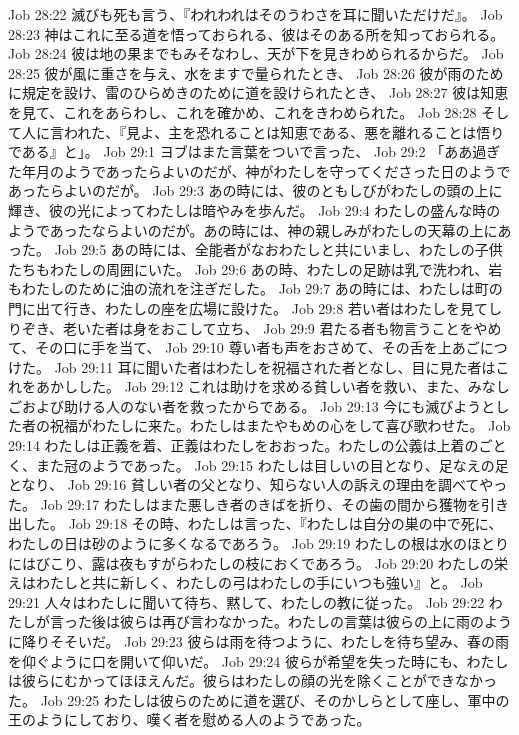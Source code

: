 Job 28:22  滅びも死も言う、『われわれはそのうわさを耳に聞いただけだ』。
Job 28:23  神はこれに至る道を悟っておられる、彼はそのある所を知っておられる。
Job 28:24  彼は地の果までもみそなわし、天が下を見きわめられるからだ。
Job 28:25  彼が風に重さを与え、水をますで量られたとき、
Job 28:26  彼が雨のために規定を設け、雷のひらめきのために道を設けられたとき、
Job 28:27  彼は知恵を見て、これをあらわし、これを確かめ、これをきわめられた。
Job 28:28  そして人に言われた、『見よ、主を恐れることは知恵である、悪を離れることは悟りである』と」。
Job 29:1  ヨブはまた言葉をついで言った、
Job 29:2  「ああ過ぎた年月のようであったらよいのだが、神がわたしを守ってくださった日のようであったらよいのだが。
Job 29:3  あの時には、彼のともしびがわたしの頭の上に輝き、彼の光によってわたしは暗やみを歩んだ。
Job 29:4  わたしの盛んな時のようであったならよいのだが。あの時には、神の親しみがわたしの天幕の上にあった。
Job 29:5  あの時には、全能者がなおわたしと共にいまし、わたしの子供たちもわたしの周囲にいた。
Job 29:6  あの時、わたしの足跡は乳で洗われ、岩もわたしのために油の流れを注ぎだした。
Job 29:7  あの時には、わたしは町の門に出て行き、わたしの座を広場に設けた。
Job 29:8  若い者はわたしを見てしりぞき、老いた者は身をおこして立ち、
Job 29:9  君たる者も物言うことをやめて、その口に手を当て、
Job 29:10  尊い者も声をおさめて、その舌を上あごにつけた。
Job 29:11  耳に聞いた者はわたしを祝福された者となし、目に見た者はこれをあかしした。
Job 29:12  これは助けを求める貧しい者を救い、また、みなしごおよび助ける人のない者を救ったからである。
Job 29:13  今にも滅びようとした者の祝福がわたしに来た。わたしはまたやもめの心をして喜び歌わせた。
Job 29:14  わたしは正義を着、正義はわたしをおおった。わたしの公義は上着のごとく、また冠のようであった。
Job 29:15  わたしは目しいの目となり、足なえの足となり、
Job 29:16  貧しい者の父となり、知らない人の訴えの理由を調べてやった。
Job 29:17  わたしはまた悪しき者のきばを折り、その歯の間から獲物を引き出した。
Job 29:18  その時、わたしは言った、『わたしは自分の巣の中で死に、わたしの日は砂のように多くなるであろう。
Job 29:19  わたしの根は水のほとりにはびこり、露は夜もすがらわたしの枝におくであろう。
Job 29:20  わたしの栄えはわたしと共に新しく、わたしの弓はわたしの手にいつも強い』と。
Job 29:21  人々はわたしに聞いて待ち、黙して、わたしの教に従った。
Job 29:22  わたしが言った後は彼らは再び言わなかった。わたしの言葉は彼らの上に雨のように降りそそいだ。
Job 29:23  彼らは雨を待つように、わたしを待ち望み、春の雨を仰ぐように口を開いて仰いだ。
Job 29:24  彼らが希望を失った時にも、わたしは彼らにむかってほほえんだ。彼らはわたしの顔の光を除くことができなかった。
Job 29:25  わたしは彼らのために道を選び、そのかしらとして座し、軍中の王のようにしており、嘆く者を慰める人のようであった。
